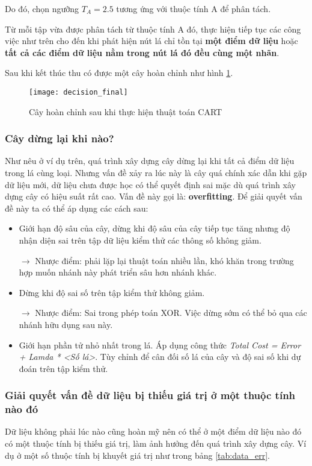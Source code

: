 \documentclass[../main-report.tex]{subfiles}
\begin{document}
Do đó, chọn ngưỡng $T_A = 2.5$ tương ứng với thuộc tính A để phân tách.

Từ mỗi tập vừa được phân tách từ thuộc tính A đó, thực hiện tiếp tục các công việc như trên cho đến khi phát hiện nút lá chỉ tồn tại \textbf{một điểm dữ liệu} hoặc \textbf{tất cả các điểm dữ liệu nằm trong nút lá đó đều cùng một nhãn}.

Sau khi kết thúc thu có được một cây hoàn chỉnh như hình \ref{fig:decision_tree_final}.

\begin{figure}[ht!]
\centering\texttt{[image: decision\_final]}
\caption{Cây hoàn chỉnh sau khi thực hiện thuật toán CART}
\label{fig:decision_tree_final}
\end{figure}

\subsubsection*{Cây dừng lại khi nào?}
\label{sec:stop_trees}
Như nêu ở ví dụ trên, quá trình xây dựng cây dừng lại khi tất cả điểm dữ liệu trong lá cùng loại. Nhưng vấn đề xảy ra lúc này là cây quá chính xác dẫn khi gặp dữ liệu mới, dữ liệu chưa  được học có thể quyết định sai mặc dù quá trình xây dựng cây có hiệu suất rất cao. Vấn đề này gọi là: \textbf{overfitting}. Để giải quyết vấn đề này ta có thể áp dụng các cách sau:

\begin{itemize}
\item Giới hạn độ sâu của cây, dừng khi độ sâu của cây tiếp tục tăng nhưng độ nhận diện sai trên tập dữ liệu kiểm thử các thông số không giảm. 

$\to$ Nhược điểm: phải lặp lại thuật toán nhiều lần, khó khăn trong trường hợp muốn nhánh này phát triển sâu hơn nhánh khác.
\item Dừng khi độ sai số trên tập kiểm thử không giảm.

$\to$ Nhược điểm: Sai trong phép toán XOR. Việc dừng sớm có thể bỏ qua các nhánh hữu dụng sau này.
\item Giới hạn phần tử nhỏ nhất trong lá. Áp dụng công thức \emph{Total Cost = Error + Lamda * <Số lá>}. Tùy chỉnh để cân đối số lá của cây và độ sai số khi dự đoán trên tập kiểm thử.
\end{itemize}

\subsubsection*{Giải quyết vấn đề dữ liệu bị thiếu giá trị ở một thuộc tính nào đó}
Dữ liệu không phải lúc nào cũng hoàn mỹ nên có thể ở một điểm dữ liệu nào đó có một thuộc tính bị thiếu giá trị, làm ảnh hưởng đến quá trình xây dựng cây. Ví dụ ở một số thuộc tính bị khuyết giá trị như trong bảng \ref{tab:data_err}.
\end{document}
